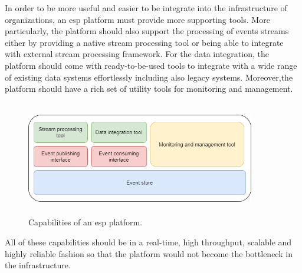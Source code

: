 In order to be more useful and easier to be integrate into the infrastructure of organizations, an \acrshort{esp} platform must provide more supporting tools. More particularly, the platform should also support the processing of events streams either by providing a native stream processing tool or being able to integrate with external stream processing framework. For the data integration, the platform should come with ready-to-be-used tools to integrate with a wide range of existing data systems effortlessly including also legacy systems. Moreover,the platform should have a rich set of utility tools for monitoring and management.

\begin{figure}[h]
	\centering
	\includegraphics[width=10cm,height=5cm]{images/espplatform.png}
	\caption{Capabilities of an \acrshort{esp} platform.}
	\label{fig:espplatform}
\end{figure}


All of these capabilities should be in a real-time, high throughput, scalable and highly reliable fashion so that the platform would not become the bottleneck in the infrastructure. 




